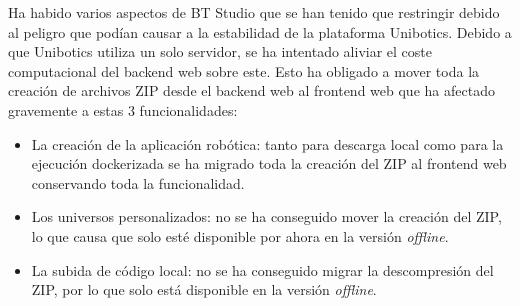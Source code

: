 Ha habido varios aspectos de BT Studio que se han tenido que restringir debido al peligro que podían causar a la estabilidad de la plataforma Unibotics. Debido a que Unibotics utiliza un solo servidor, se ha intentado aliviar el coste computacional del backend web sobre este. Esto ha obligado a mover toda la creación de archivos ZIP desde el backend web al frontend web que ha afectado gravemente a estas 3 funcionalidades:

\begin{itemize}
    \item La creación de la aplicación robótica: tanto para descarga local como para la ejecución dockerizada se ha migrado toda la creación del ZIP al frontend web conservando toda la funcionalidad.
    \item Los universos personalizados: no se ha conseguido mover la creación del ZIP, lo que causa que solo esté disponible por ahora en la versión \textit{offline}.
    \item La subida de código local: no se ha conseguido migrar la descompresión del ZIP, por lo que solo está disponible en la versión \textit{offline}.
\end{itemize}